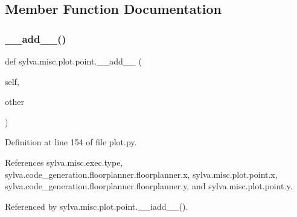 \subsection{Member Function Documentation}
\mbox{\label{classsylva_1_1misc_1_1plot_1_1point_abd550240b0bf5fb6fca1d4a2c9bd9db2}} 
\subsubsection{\texorpdfstring{\+\_\+\+\_\+add\+\_\+\+\_\+()}{\_\_add\_\_()}}
{\footnotesize\ttfamily def sylva.\+misc.\+plot.\+point.\+\_\+\+\_\+add\+\_\+\+\_\+ (\begin{DoxyParamCaption}\item[{}]{self,  }\item[{}]{other }\end{DoxyParamCaption})}



Definition at line 154 of file plot.\+py.



References sylva.\+misc.\+exec.\+type, sylva.\+code\+\_\+generation.\+floorplanner.\+floorplanner.\+x, sylva.\+misc.\+plot.\+point.\+x, sylva.\+code\+\_\+generation.\+floorplanner.\+floorplanner.\+y, and sylva.\+misc.\+plot.\+point.\+y.



Referenced by sylva.\+misc.\+plot.\+point.\+\_\+\+\_\+iadd\+\_\+\+\_\+().


